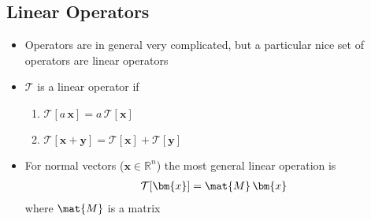 
\begin{slide}
\section{Linear Operators}

\begin{PauseHighLight}
  \begin{itemize}
  \item Operators are in general very complicated, but a particular nice set
    of operators are linear operators\pause
  \item $\mathcal{T}$ is a linear operator if
    \begin{enumerate}
    \item $\mathcal{T}[a\,\bm{x}] = a\,\mathcal{T}[\bm{x}]$
    \item $\mathcal{T}[\bm{x} + \bm{y}] = \mathcal{T}[\bm{x}] +
      \mathcal{T}[\bm{y}]$\pause
    \end{enumerate}
  \item For normal vectors ($\bm{x}\in\mathbb{R}^n$) the most general linear operation is
    \begin{align*}
      \mathcal{T}[\bm{x}] = \mat{M}\,\bm{x}
    \end{align*}
  where $\mat{M}$ is a matrix\pause
  \end{itemize}
\end{PauseHighLight}

\end{slide}


